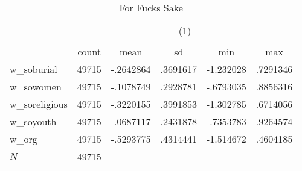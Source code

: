 \begin{table}[htbp]\centering
\def\sym#1{\ifmmode^{#1}\else\(^{#1}\)\fi}
\caption{For Fucks Sake\label{tab1}}
\begin{tabular}{l*{1}{ccccc}}
\hline\hline
            &\multicolumn{5}{c}{(1)}                                         \\
            &\multicolumn{5}{c}{}                                            \\
            &       count&        mean&          sd&         min&         max\\
\hline
w\_soburial  &       49715&   -.2642864&    .3691617&   -1.232028&    .7291346\\
w\_sowomen   &       49715&   -.1078749&    .2928781&   -.6793035&    .8856316\\
w\_soreligious&       49715&   -.3220155&    .3991853&   -1.302785&    .6714056\\
w\_soyouth   &       49715&   -.0687117&    .2431878&   -.7353783&    .9264574\\
w\_org       &       49715&   -.5293775&    .4314441&   -1.514672&    .4604185\\
\hline
\(N\)       &       49715&            &            &            &            \\
\hline\hline
\end{tabular}
\end{table}
